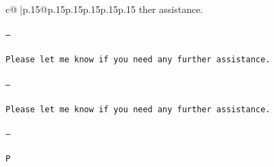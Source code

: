 \documentclass{article}
\begin{document}
{\begin{supertabular}{c@{$\;$}|p{.15\linewidth}@{}p{.15\linewidth}p{.15\linewidth}p{.15\linewidth}p{.15\linewidth}p{.15\linewidth}}
{{{ther assistance. \\ \tt \\ \tt ---\\ \tt \\ \tt Please let me know if you need any further assistance. \\ \tt \\ \tt ---\\ \tt \\ \tt Please let me know if you need any further assistance. \\ \tt \\ \tt ---\\ \tt \\ \tt P}}}
\end{supertabular}}
\end{document}
